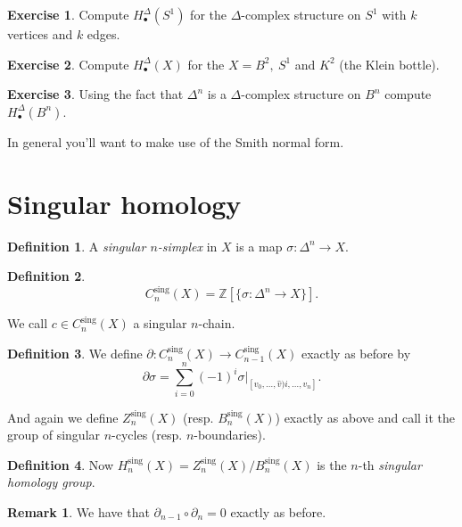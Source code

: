 \documentclass{article}
\theoremstyle{definition}
\newtheorem*{defn}{Definition}
\newtheorem*{exer}{Exercise}
\newtheorem*{rem}{Remark}
\newcommand{\ZZ}{\mathbb{Z}}
\begin{document}
\begin{exer}
Compute $H_\bullet^\Delta (S^1)$ for the $\Delta$-complex structure on $S^1$ with $k$ vertices and $k$ edges.
\end{exer}

\begin{exer}
Compute $H_\bullet^\Delta (X)$ for the $X = B^2,\ S^1$ and $K^2$ (the Klein bottle).
\end{exer}

\begin{exer}
Using the fact that $\Delta^n$ is a $\Delta$-complex structure on $B^n$ compute $H_\bullet^\Delta (B^n)$.

In general you'll want to make use of the Smith normal form.
\end{exer}

\section{Singular homology}
\begin{defn}
A \emph{singular $n$-simplex} in $X$ is a map $\sigma \colon \Delta^n \to X$.
\end{defn}

\begin{defn}
\[
C_n^{\text{sing}}(X) = \ZZ[\{\sigma\colon \Delta^n \to X\}].\]
\end{defn}

We call $c \in C_n^\text{sing}(X)$ a singular $n$-chain.

\begin{defn}
We define $\partial\colon C_n^\text{sing}(X) \to C_{n-1}^\text{sing}(X)$ exactly as before by
\[\partial \sigma = \sum_{i=0}^{n} (-1)^i \sigma|_{[v_0,\ldots,\hat{v})i, \ldots, v_n]}.\]
\end{defn}

And again we define $Z_n^\text{sing}(X)$ (resp. $B_n^\text{sing}(X)$) exactly as above and call it the group of singular $n$-cycles (resp. $n$-boundaries).

\begin{defn}
Now $H_n^\text{sing}(X) = Z_n^\text{sing}(X)/B_n^\text{sing}(X)$ is the $n$-th \emph{singular homology group}.
\end{defn}

\begin{rem}
We have that $\partial_{n-1}\circ \partial_n = 0$ exactly as before.
\end{rem}
\end{document}

